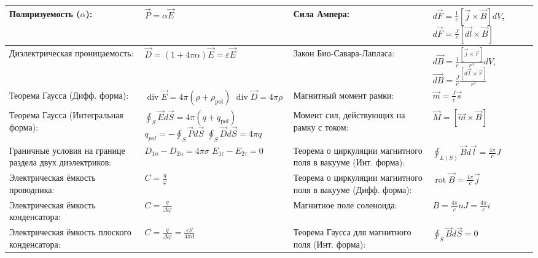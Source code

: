 \documentclass{article}
\begin{document}
\begin{tabular}{ |p{6cm}|p{3.5cm}|p{6cm}|p{3.5cm}|  }
\hline
Поляризуемость ($\alpha$):                                                 &
$\vec{P} = \alpha \vec{E}$                                                 &
Сила Ампера:                                                               &
$d \vec{F}=\frac{1}{c} [\vec{j} \times \vec{B}] d V$,
$d \vec{F}=\frac{J}{c} [\vec{d{l}} \times \vec{B}]$                        \\
\hline
Диэлектрическая проницаемость:                                             &
$\vec{D}=(1+4 \pi \alpha) \vec{E}=\varepsilon \vec{E}$                     &
Закон Био-Савара-Лапласа:                                                  &
$d \vec{B}=\frac{1}{c} \frac{[\vec{j} \times \vec{r}]}{r^{3}} d V$,
$\vec{d{B}}=\frac{J}{c} \frac{[d \vec{l} \times \vec{r}]}{r^{3}}$          \\
\hline
Теорема Гаусса (Дифф. форма):                                              &
$\operatorname{div}{\vec{E}} = 4 \pi \left( \rho+\rho_{\mathrm{pol}} \right)$
$\operatorname{div}{\vec{D}} = 4 \pi \rho$                                 &
Магнитный момент рамки:                                                    &
$\vec{m}=\frac{J}{c} \vec{s}$                                              \\
\hline
Теорема Гаусса (Интегральная форма):                                       &
$\oint_{S} \vec{E} d \vec{S}=4 \pi \left(q+q_{\mathrm{pol}}\right)$ $q_{pol}=-\oint_{S} \vec{P} d \vec{S}$ $\oint_{S} \vec{D} d \vec{S}=4 \pi q$ &
Момент сил, действующих на рамку с током:                                  &
$\vec{M}= [\vec{m} \times \vec{B}]$                                        \\
\hline
Граничные условия на границе раздела двух диэлектриков:                    &
$D_{1 n}-D_{2 n}=4 \pi \sigma$ $E_{1 \tau}-E_{2 \tau}=0$                   &
Теорема о циркуляции магнитного поля в вакууме (Инт. форма):               &
$\oint_{L(S)} \vec{B} d \vec{l}=\frac{4 \pi}{c} J$                         \\
\hline
Электрическая ёмкость проводника:                                          &
$C= \frac{q}{\varphi}$                                                     &
Теорема о циркуляции магнитного поля в вакууме (Дифф. форма):              &
$\operatorname{rot} \vec{B}=\frac{4 \pi}{c} \vec{j}$                       \\
\hline
Электрическая ёмкость конденсатора:                                        &
$C=\frac {q}{\Delta \varphi}$                                              &
Магнитное поле соленоида:                                                  &
$B = \frac{4 \pi}{c} n J=\frac{4 \pi}{c} i$                                \\
\hline
Электрическая ёмкость плоского конденсатора:                               &
$C=\frac{q}{\Delta \varphi}=\frac{\varepsilon S}{4 \pi d}$                 &
Теорема Гаусса для магнитного поля (Инт. форма):                           &
$\oint_{S} \vec{B} d \vec{S}=0$                                            \\
\hline
\end{tabular}
\end{document}
